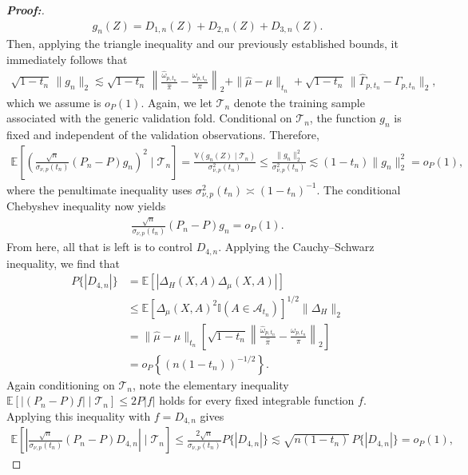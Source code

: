 \documentclass[10pt,a4paper]{amsart}
\begin{document}
\begin{proof}[\textbf{Proof:}]
\begin{align*}
     g_n(Z) = D_{1,n}(Z) + D_{2,n}(Z) + D_{3,n}(Z).
\end{align*}
Then, applying the triangle inequality and our previously established bounds, it immediately follows that
\begin{align*}
    \sqrt{1-t_n}\,\|g_n\|_2 \lesssim \sqrt{1-t_n}\, \left\| \frac{\widehat\omega_{p,t_n}}{\widehat\pi} - \frac{\omega_{p,t_n}}{\pi} \right\|_2 + \|\widehat\mu-\mu\|_{t_n} + \sqrt{1-t_n}\, \|\widehat\Gamma_{p,t_n}-\Gamma_{p,t_n}\|_2,
\end{align*}
which we assume is $o_P(1)$. Again, we let $\mathcal{T}_n$ denote the training sample associated with the generic validation fold. Conditional on $\mathcal T_n$, the function $g_n$ is fixed and independent of the validation observations. Therefore,
\begin{align*}
    \mathbb{E}\!\left[\left(\frac{\sqrt{n}}{\sigma_{\nu,p}(t_n)} (P_n-P)g_n \right)^2 \mid \mathcal{T}_n \right] =  \frac{\mathbb{V}(g_n(Z)\mid\mathcal{T}_n)}{\sigma_{\nu,p}^2(t_n)} \leq \frac{\|g_n\|_2^2}{\sigma_{\nu,p}^2(t_n)} \lesssim (1-t_n)\|g_n\|_2^2 = o_P(1),
\end{align*}
where the penultimate inequality uses $\sigma_{\nu,p}^2(t_n)\asymp(1-t_n)^{-1}$. The conditional Chebyshev inequality now yields
\begin{align*}
    \frac{\sqrt{n}}{\sigma_{\nu,p}(t_n)} (P_n-P)g_n = o_P(1).
\end{align*}
From here, all that is left is to control $D_{4,n}$. Applying the Cauchy--Schwarz inequality, we find that
\begin{align*}
    P\{|D_{4,n}|\} &= \mathbb{E}\!\left[ |\Delta_H(X,A)\Delta_\mu(X,A)| \right] \\
    &\leq \mathbb{E}\!\left[ \Delta_\mu(X,A)^2 \mathbb{I}(A\in\mathcal A_{t_n})\right]^{1/2} \|\Delta_H\|_2 \\
    &= \|\widehat\mu-\mu\|_{t_n} \left[ \sqrt{1-t_n} \left\| \frac{\widehat\omega_{p,t_n}}{\widehat\pi} - \frac{\omega_{p,t_n}}{\pi} \right\|_2 \right] \\
    &= o_P\!\left\{ (n(1-t_n))^{-1/2} \right\}.
\end{align*}
Again conditioning on $\mathcal T_n$, note the elementary inequality $\mathbb{E}\!\left[ |(P_n-P)f| \mid  \mathcal{T}_n \right] \leq 2P|f|$ holds for every fixed integrable function $f$. Applying this inequality with $f=D_{4,n}$ gives
\begin{align*}
    \mathbb{E}\!\left[ \left| \frac{\sqrt{n}}{\sigma_{\nu,p}(t_n)} (P_n-P)D_{4,n} \right| \mid \mathcal{T}_n \right] \leq \frac{2\sqrt n}{\sigma_{\nu,p}(t_n)} P\{|D_{4,n}| \} \lesssim \sqrt{n(1-t_n)}\,P\{|D_{4,n}|\} = o_P(1),

\end{align*}
\end{proof}
\end{document}
